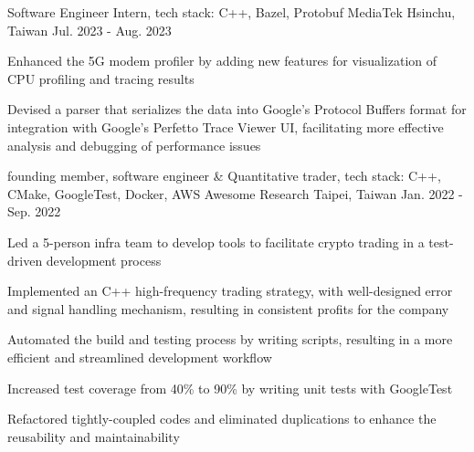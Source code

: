 

\begin{cventries}

  \cventry
    {Software Engineer Intern, \color{awesome}tech stack: C++, Bazel, Protobuf} %
    {MediaTek} %
    {Hsinchu, Taiwan} %
    {Jul. 2023 - Aug. 2023} %
    {
      \begin{cvitems} %
        \item {Enhanced the 5G modem profiler by adding new features for visualization of CPU profiling and tracing results}
        \item {Devised a parser that serializes the data into Google's Protocol Buffers format for integration with Google's Perfetto Trace Viewer UI, facilitating more effective analysis and debugging of performance issues}
      \end{cvitems}
    }

  \cventry
    {founding member, software engineer \& Quantitative trader, \color{awesome} tech stack: C++, CMake, GoogleTest, Docker, AWS} %
    {Awesome Research} %
    {Taipei, Taiwan} %
    {Jan. 2022 - Sep. 2022} %
    {
      \begin{cvitems} %
        \item Led a 5-person infra team to develop tools to facilitate crypto trading in a test-driven development process
        \item Implemented an C++ high-frequency trading strategy, with well-designed error and signal handling mechanism, resulting in consistent profits for the company 
        \item Automated the build and testing process by writing scripts, resulting in a more efficient and streamlined development workflow
        \item Increased test coverage from 40\% to 90\% by writing unit tests with GoogleTest
        \item Refactored tightly-coupled codes and eliminated duplications to enhance the reusability and maintainability
      \end{cvitems}
    }

\end{cventries}
